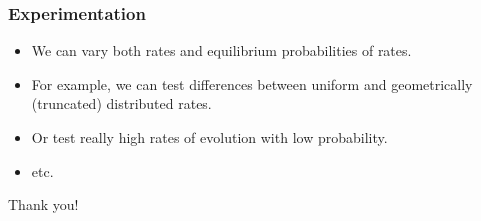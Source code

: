 \documentclass{beamer}
\begin{document}
\begin{frame}
    \frametitle{Experimentation}
    \begin{itemize}
    \item We can vary both rates and equilibrium probabilities of rates.
    \item For example, we can test differences between uniform and geometrically (truncated) distributed rates.
    \item Or test really high rates of evolution with low probability.
    \item etc.
    \end{itemize}
\end{frame}

\begin{frame}
    \begin{center}
        Thank you!
    \end{center}
\end{frame}
\end{document}
